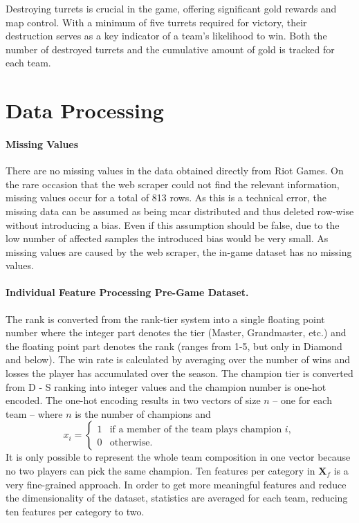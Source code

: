 \documentclass[12pt, a4paper, headinclude, twoside, plainheadsepline, open=right, numbers=noenddot, hidelinks, toc=listof, toc=bibliography]{scrreprt}
\begin{document}
Destroying turrets is crucial in the game, offering significant gold rewards and map control. 
With a minimum of five turrets required for victory, their destruction serves as a key indicator of a team's likelihood to win.
Both the number of destroyed turrets and the cumulative amount of gold is tracked for each team.

\section{Data Processing}
\label{sec:data_processing}

\paragraph{Missing Values}
There are no missing values in the data obtained directly from Riot Games.
On the rare occasion that the web scraper could not find the relevant information, missing values occur for a total of 813 rows.
As this is a technical error, the missing data can be assumed as being \ac{mcar} distributed \cite{acockWorkingMissingValues2005} and thus deleted row-wise without introducing a bias.
Even if this assumption should be false, due to the low number of affected samples the introduced bias would be very small.
As missing values are caused by the web scraper, the in-game dataset has no missing values.

\paragraph{Individual Feature Processing Pre-Game Dataset.}
The rank is converted from the rank-tier system into a single floating point number where the integer part denotes the tier (Master, Grandmaster, etc.) and the floating point part denotes the rank (ranges from 1-5, but only in Diamond and below).
The win rate is calculated by averaging over the number of wins and losses the player has accumulated over the season.
The champion tier is converted from D - S ranking into integer values and the champion number is one-hot encoded.
The one-hot encoding results in two vectors of size $n$ -- one for each team -- where $n$ is the number of champions and 
\begin{equation*}
x_i = 
\begin{cases}
	1 & \text{if a member of the team plays champion } i, \\
	0 & \text{otherwise}.
\end{cases}
\end{equation*}
It is only possible to represent the whole team composition in one vector because no two players can pick the same champion.
Ten features per category in $\mathbf{X}_f$ is a very fine-grained approach.
In order to get more meaningful features and reduce the dimensionality of the dataset, statistics are averaged for each team, reducing ten features per category to two.
\end{document}
